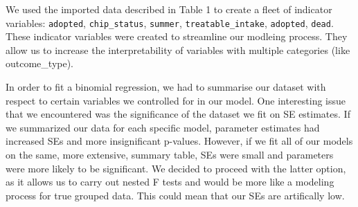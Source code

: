 \documentclass[]{article}
\begin{document}
\begin{table}[!h]

\caption{\label{tab:variable table}Description of Variables}
\centering
{}
\end{table}

We used the imported data described in Table 1 to create a fleet of
indicator variables: \texttt{adopted}, \texttt{chip\_status},
\texttt{summer}, \texttt{treatable\_intake}, \texttt{adopted},
\texttt{dead}. These indicator variables were created to streamline our
modleing process. They allow us to increase the interpretability of
variables with multiple categories (like outcome\_type).

In order to fit a binomial regression, we had to summarise our dataset
with respect to certain variables we controlled for in our model. One
interesting issue that we encountered was the significance of the
dataset we fit on SE estimates. If we summarized our data for each
specific model, parameter estimates had increased SEs and more
insignificant p-values. However, if we fit all of our models on the
same, more extensive, summary table, SEs were small and parameters were
more likely to be significant. We decided to proceed with the latter
option, as it allows us to carry out nested F tests and would be more
like a modeling process for true grouped data. This could mean that our
SEs are artifically low.
\end{document}
